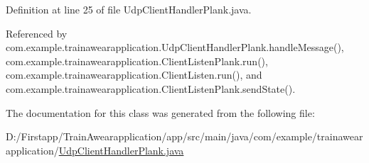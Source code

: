 Definition at line 25 of file Udp\+Client\+Handler\+Plank.\+java.



Referenced by com.\+example.\+trainawearapplication.\+Udp\+Client\+Handler\+Plank.\+handle\+Message(), com.\+example.\+trainawearapplication.\+Client\+Listen\+Plank.\+run(), com.\+example.\+trainawearapplication.\+Client\+Listen.\+run(), and com.\+example.\+trainawearapplication.\+Client\+Listen\+Plank.\+send\+State().



The documentation for this class was generated from the following file\+:\begin{DoxyCompactItemize}
\item 
D\+:/\+Firstapp/\+Train\+Awearapplication/app/src/main/java/com/example/trainawearapplication/\mbox{\hyperlink{_udp_client_handler_plank_8java}{Udp\+Client\+Handler\+Plank.\+java}}\end{DoxyCompactItemize}
